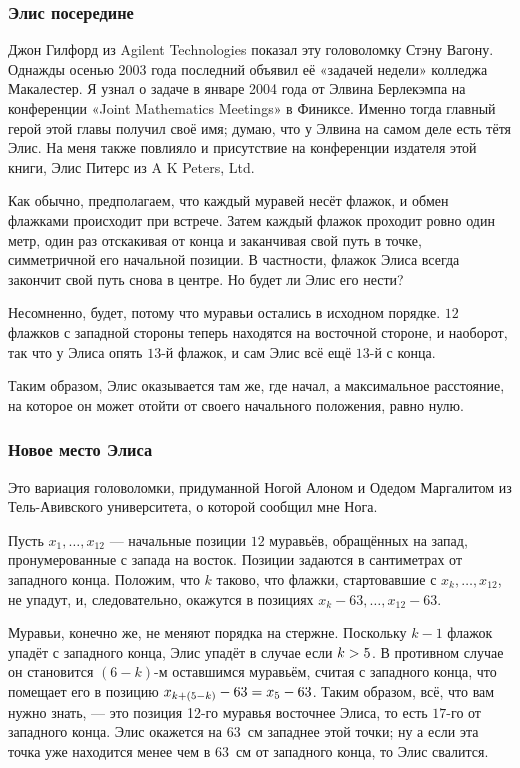 \subsubsection*{Элис посередине}

Джон Гилфорд из Agilent Technologies показал эту головоломку Стэну Вагону.
Однажды осенью 2003 года последний объявил её «задачей недели» колледжа Макалестер.
Я узнал о задаче в январе 2004 года от Элвина Берлекэмпа на конференции «Joint Mathematics Meetings» в Финиксе.
Именно тогда главный герой этой главы получил своё имя;
думаю, что у Элвина на самом деле есть тётя Элис.
На меня также повлияло и присутствие на конференции издателя этой книги, Элис Питерс из A K Peters, Ltd.

Как обычно, предполагаем, что каждый муравей несёт флажок, и обмен флажками происходит при встрече.
Затем каждый флажок проходит ровно один метр, один раз отскакивая от конца и заканчивая свой путь в точке, симметричной его начальной позиции.
В частности, флажок Элиса всегда закончит свой путь снова в центре. Но будет ли Элис его нести?

Несомненно, будет, потому что муравьи остались в исходном порядке.
$12$ флажков с западной стороны теперь находятся на восточной стороне, и наоборот, так что у Элиса опять $13$-й флажок, и сам Элис всё ещё $13$-й с конца.

Таким образом, Элис оказывается там же, где начал, а максимальное расстояние, на которое он может отойти от своего начального положения, равно нулю.

\subsubsection*{Новое место Элиса}

Это вариация головоломки, придуманной Ногой Алоном и Одедом Маргалитом из Тель-Авивского университета, о которой сообщил мне Нога.

Пусть $x_1,\dots,x_{12}$ --- начальные позиции $12$ муравьёв, обращённых на запад, пронумерованные с запада на восток.
Позиции задаются в сантиметрах от западного конца.
Положим, что $k$ таково, что флажки, стартовавшие с $x_k,\dots,x_{12}$, не упадут, и, следовательно, окажутся в позициях $x_k-63,\dots,x_{12}-63$.

Муравьи, конечно же, не меняют порядка на стержне.
Поскольку $k-1$ флажок упадёт с западного конца, Элис упадёт в случае если $k\z> 5$.
В противном случае он становится $(6-k)$-м оставшимся муравьём, считая с западного конца, что помещает его в позицию $x_{k+(5-k)}-63\z=x_5-63$.
Таким образом, всё, что вам нужно знать, --- это позиция 12-го муравья восточнее Элиса, то есть $17$-го от западного конца.
Элис окажется на $63$~см западнее этой точки; ну а если эта точка уже находится менее чем в $63$~см от западного конца, то Элис свалится.

